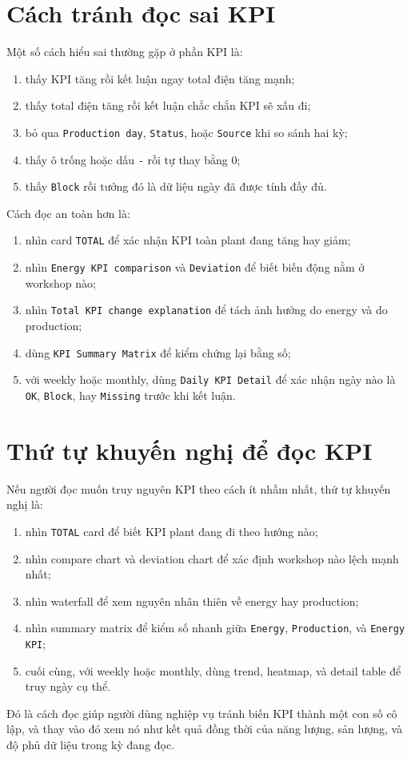 \section{Cách tránh đọc sai KPI}

Một số cách hiểu sai thường gặp ở phần KPI là:

\begin{enumerate}[label=-]
\item thấy KPI tăng rồi kết luận ngay total điện tăng mạnh;
\item thấy total điện tăng rồi kết luận chắc chắn KPI sẽ xấu đi;
\item bỏ qua \texttt{Production day}, \texttt{Status}, hoặc \texttt{Source} khi so sánh hai kỳ;
\item thấy ô trống hoặc dấu \texttt{-} rồi tự thay bằng 0;
\item thấy \texttt{Block} rồi tưởng đó là dữ liệu ngày đã được tính đầy đủ.
\end{enumerate}

Cách đọc an toàn hơn là:

\begin{enumerate}[label=-]
\item nhìn card \texttt{TOTAL} để xác nhận KPI toàn plant đang tăng hay giảm;
\item nhìn \texttt{Energy KPI comparison} và \texttt{Deviation} để biết biến động nằm ở workshop nào;
\item nhìn \texttt{Total KPI change explanation} để tách ảnh hưởng do energy và do production;
\item dùng \texttt{KPI Summary Matrix} để kiểm chứng lại bằng số;
\item với weekly hoặc monthly, dùng \texttt{Daily KPI Detail} để xác nhận ngày nào là \texttt{OK}, \texttt{Block}, hay \texttt{Missing} trước khi kết luận.
\end{enumerate}

\section{Thứ tự khuyến nghị để đọc KPI}

Nếu người đọc muốn truy nguyên KPI theo cách ít nhầm nhất, thứ tự khuyến nghị là:

\begin{enumerate}[label=-]
\item nhìn \texttt{TOTAL} card để biết KPI plant đang đi theo hướng nào;
\item nhìn compare chart và deviation chart để xác định workshop nào lệch mạnh nhất;
\item nhìn waterfall để xem nguyên nhân thiên về energy hay production;
\item nhìn summary matrix để kiểm số nhanh giữa \texttt{Energy}, \texttt{Production}, và \texttt{Energy KPI};
\item cuối cùng, với weekly hoặc monthly, dùng trend, heatmap, và detail table để truy ngày cụ thể.
\end{enumerate}

Đó là cách đọc giúp người dùng nghiệp vụ tránh biến KPI thành một con số cô lập, và thay vào đó xem nó như kết quả đồng thời của năng lượng, sản lượng, và độ phủ dữ liệu trong kỳ đang đọc.
